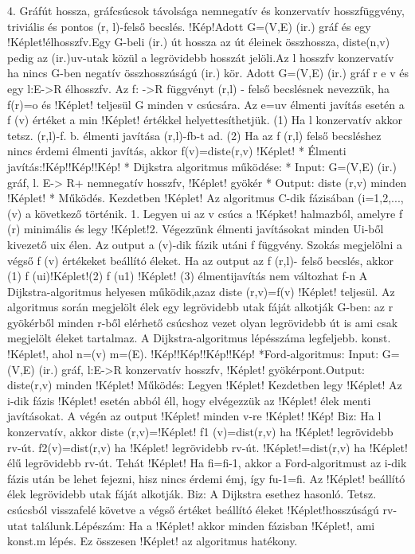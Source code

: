 \documentclass[10pt]{article}
\begin{document}
4.
Gráfút hossza, gráfcsúcsok távolsága nemnegatív és konzervatív hosszfüggvény, triviális és pontos (r, l)-felső becslés.
!Kép!Adott G=(V,E) (ir.) gráf és egy !Képlet!élhosszfv.Egy G-beli  (ir.) út hossza az út éleinek összhossza, diste(n,v) pedig az (ir.)uv-utak közül a legrövidebb hosszát jelöli.Az l hosszfv konzervatív ha nincs G-ben negatív összhosszúságú (ir.) kör. Adott G=(V,E) (ir.) gráf r e v és egy l:E->R élhosszfv. Az f: ->R függvényt (r,l) - felső becslésnek nevezzük, ha f(r)=o és !Képlet! teljesül G minden v csúcsára. Az e=uv élmenti javítás esetén a f (v) értéket a min !Képlet! értékkel helyettesíthetjük.  (1) Ha l konzervatív akkor tetsz.  (r,l)-f. b. élmenti javítása (r,l)-fb-t ad. (2) Ha az f (r,l) felső becsléshez nincs érdemi élmenti javítás, akkor f(v)=diste(r,v) !Képlet!
* Élmenti javítás:!Kép!!Kép!!Kép!
* Dijkstra algoritmus működése:
* Input: G=(V,E) (ir.) gráf, l. E-> R+ nemnegatív hosszfv, !Képlet! gyökér
* Output: diste (r,v) minden !Képlet!
* Működés. Kezdetben !Képlet! Az algoritmus C-dik fázisában (i=1,2,..., (v) a következő történik. 1. Legyen ui az v csúcs a !Képket! halmazból, amelyre f (r) minimális és legy !Képlet!2. Végezzünk élmenti javításokat minden Ui-ből kivezető uix élen. Az output a (v)-dik fázik utáni f függvény. Szokás  megjelölni a végső f (v) értékeket beállító éleket. Ha az output az f (r,l)- felső becslés, akkor (1) f (ui)!Képlet!(2) f (u1) !Képlet! (3) élmentijavítás nem változhat f-n
A Dijkstra-algoritmus helyesen működik,azaz diste (r,v)=f(v) !Képlet! teljesül. Az algoritmus során megjelölt élek egy legrövidebb utak fáját alkotják G-ben: az r gyökérből minden r-ből elérhető csúcshoz vezet olyan legrövidebb út is ami csak megjelölt éleket tartalmaz. A Dijkstra-algoritmus lépésszáma legfeljebb. konst. !Képlet!, ahol n=(v) m=(E).
!Kép!!Kép!!Kép!!Kép!
*Ford-algoritmus: Input: G=(V,E) (ir.) gráf, l:E->R konzervatív hosszfv, !Képlet! gyökérpont.Output: diste(r,v) minden !Képlet! Működés: Legyen !Képlet! Kezdetben legy !Képlet! Az i-dik fázis !Képlet! esetén abból éll, hogy elvégezzük az !Képlet! élek menti javításokat. A végén az output !Képlet! minden v-re !Képlet!
!Kép!
Biz: Ha l konzervatív, akkor diste (r,v)=!Képlet! f1 (v)=dist(r,v) ha !Képlet! legrövidebb rv-út. f2(v)=dist(r,v) ha !Képlet! legrövidebb rv-út. !Képlet!=dist(r,v) ha !Képlet! élű legrövidebb rv-út. Tehát !Képlet! Ha fi=fi-1, akkor a Ford-algoritmust az i-dik fázis után be lehet fejezni, hisz nincs érdemi émj, így fu-1=fi. Az !Képlet! beállító élek legrövidebb utak fáját alkotják.
Biz: A Dijkstra esethez hasonló. Tetsz. csúcsból visszafelé követve a végső értéket beállító éleket !Képlet!hosszúságú rv-utat találunk.Lépészám: Ha a !Képlet! akkor minden fázisban !Képlet!, ami konst.m lépés. Ez összesen !Képlet! az algoritmus hatékony.
\end{document}
